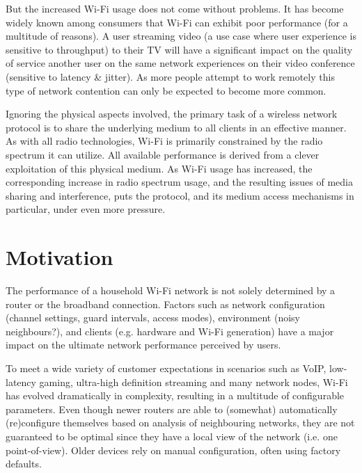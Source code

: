 But the increased Wi-Fi usage does not come without problems. It has become
widely known among consumers that Wi-Fi can exhibit poor performance (for a
multitude of reasons). A user streaming video (a use case where user
experience is sensitive to throughput) to their TV will have a significant
impact on the quality of service another user on the same network experiences
on their video conference (sensitive to latency \& jitter). As more people
attempt to work remotely this type of network contention can only be expected
to become more common.

Ignoring the physical aspects involved, the primary task of a wireless network
protocol is to share the underlying medium to all clients in an effective
manner. As with all radio technologies, Wi-Fi is primarily constrained by the
radio spectrum it can utilize. All available performance is derived from a
clever exploitation of this physical medium. As Wi-Fi usage has increased, the
corresponding increase in radio spectrum usage, and the resulting issues of media
sharing and interference, puts the protocol, and its medium access mechanisms
in particular, under even more pressure.

\section{Motivation}


The performance of a household Wi-Fi network is not solely determined by a router
or the broadband connection. Factors such as network configuration (channel
settings, guard intervals, access modes), environment (noisy neighbours?), and
clients (e.g. hardware and Wi-Fi generation) have a major impact on the ultimate
network performance perceived by users.

To meet a wide variety of customer expectations in scenarios such as VoIP,
low-latency gaming, ultra-high definition streaming and many network nodes,
Wi-Fi has evolved dramatically in complexity, resulting in a multitude of
configurable parameters. Even though newer routers are able to (somewhat)
automatically (re)configure themselves based on analysis of neighbouring
networks, they are not guaranteed to be optimal since they have a local view
of the network (i.e. one point-of-view). Older devices rely on manual
configuration, often using factory defaults.

